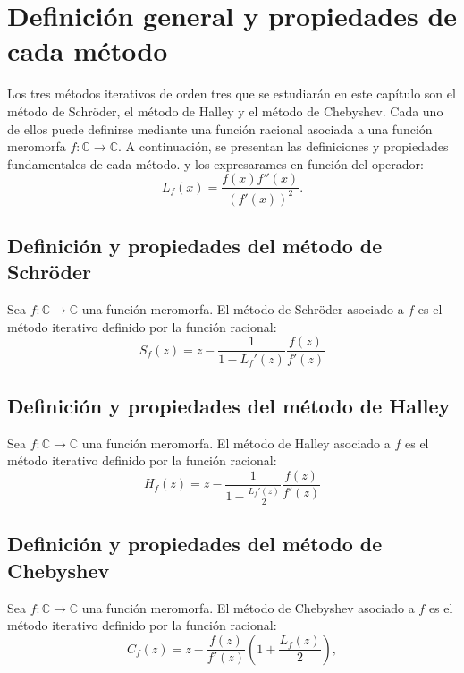 % 

\section{Definición general y propiedades de cada método}
Los tres métodos iterativos de orden tres que se estudiarán en este capítulo son el método de Schröder, el método de Halley y el método de Chebyshev. Cada uno de ellos puede definirse mediante una función racional asociada a una función meromorfa \( f:\mathbb{C}\to\mathbb{C} \). A continuación, se presentan las definiciones y propiedades fundamentales de cada método. y los
expresarames en función del operador:
\[
 L_f(x)=\frac{f(x)f''(x)}{(f'(x))^2}.
\]
\subsection{Definición y propiedades del método de Schröder}

Sea $f:\mathbb{C}\to\mathbb{C}$ una función meromorfa. El método de Schröder asociado a $f$ es el método iterativo definido por la función racional:
\begin{equation}
	S_f(z) = z - \frac{1}{1-L_f'(z)} 
    	\frac{f(z)}{f'(z)}
\end{equation}



\subsection{Definición y propiedades del método de Halley}

Sea $f:\mathbb{C}\to\mathbb{C}$ una función meromorfa. El método de Halley asociado a $f$ es el método iterativo definido por la función racional:
\begin{equation}
	H_f(z) = z - \frac{1}{1-\frac{L_f'(z)}{2}} 
    	\frac{f(z)}{f'(z)}
\end{equation}




\subsection{Definición y propiedades del método de Chebyshev}
Sea $f:\mathbb{C}\to\mathbb{C}$ una función meromorfa. El método de Chebyshev asociado a $f$ es el método iterativo definido por la función racional:
\begin{equation}
	C_f(z) = z - \frac{f(z)}{f'(z)} \left( 1+\frac{L_f(z)}{2}\right),
\end{equation}

